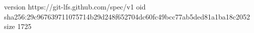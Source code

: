 version https://git-lfs.github.com/spec/v1
oid sha256:29c967639711075714b29d248f652704dc60fc49bcc77ab5ded81a1ba18c2052
size 1725

